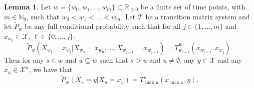 \documentclass[10pt,a4paper]{paper}
\theoremstyle{definition}
\newtheorem{lemma}[theorem]{Lemma}
\newcommand{\nats}{\mathbb{N}}
\newcommand{\reals}{\mathbb{R}}
\newcommand{\states}{\mathcal{X}}
\begin{document}
\begin{lemma}\label{lemma:simplechainextend}
Let $w=\{w_0,w_1,\dots,w_m\}\subset\reals_{\geq0}$ be a finite set of time points, with $m\in\nats_0$, such that $w_0<w_1<\dots<w_m$. Let $\mathcal{T}$ be a transition matrix system and let $\tilde{P}_w$ be any full conditional probability such that for all $j\in\{1,\dots,m\}$ and $x_{w_{\ell}}\in\states$, $\ell\in\{0,\dots,j\}$:
\begin{equation*}
\tilde{P}_w(X_{w_j}=x_{w_j}\vert X_{w_0}=x_{w_0},\dots,X_{w_{j-1}}=x_{w_{j-1}})=T_{w_{j-1}}^{w_j}(x_{w_{j-1}},x_{w_j}).
\end{equation*}
Then for any $s\in w$ and $u\subseteq w$ such that $s>u$ and $u\neq\emptyset$, any $y\in\states$ and any $x_u\in\states^u$, we have that
\begin{equation*}
\tilde{P}_w(X_s=y\vert X_u=x_u)
=T_{\max u}^s(x_{\max u},y).
\end{equation*}
\end{lemma}
\end{document}
